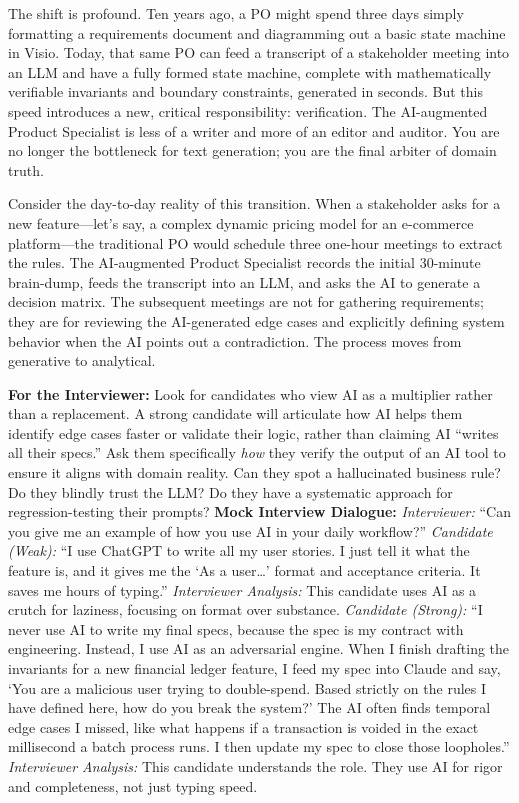 \documentclass[
  11pt,
  openany,
  oneside]{book}
\renewenvironment{quote}{\begin{customquote}}{\end{customquote}}
\begin{document}
The shift is profound. Ten years ago, a PO might spend three days simply
formatting a requirements document and diagramming out a basic state
machine in Visio. Today, that same PO can feed a transcript of a
stakeholder meeting into an LLM and have a fully formed state machine,
complete with mathematically verifiable invariants and boundary
constraints, generated in seconds. But this speed introduces a new,
critical responsibility: verification. The AI-augmented Product
Specialist is less of a writer and more of an editor and auditor. You
are no longer the bottleneck for text generation; you are the final
arbiter of domain truth.

Consider the day-to-day reality of this transition. When a stakeholder
asks for a new feature---let's say, a complex dynamic pricing model for
an e-commerce platform---the traditional PO would schedule three
one-hour meetings to extract the rules. The AI-augmented Product
Specialist records the initial 30-minute brain-dump, feeds the
transcript into an LLM, and asks the AI to generate a decision matrix.
The subsequent meetings are not for gathering requirements; they are for
reviewing the AI-generated edge cases and explicitly defining system
behavior when the AI points out a contradiction. The process moves from
generative to analytical.

\begin{quote}
\textbf{For the Interviewer:} Look for candidates who view AI as a
multiplier rather than a replacement. A strong candidate will articulate
how AI helps them identify edge cases faster or validate their logic,
rather than claiming AI ``writes all their specs.'' Ask them
specifically \emph{how} they verify the output of an AI tool to ensure
it aligns with domain reality. Can they spot a hallucinated business
rule? Do they blindly trust the LLM? Do they have a systematic approach
for regression-testing their prompts? \textbf{Mock Interview Dialogue:}
\emph{Interviewer:} ``Can you give me an example of how you use AI in
your daily workflow?'' \emph{Candidate (Weak):} ``I use ChatGPT to write
all my user stories. I just tell it what the feature is, and it gives me
the `As a user\ldots{}' format and acceptance criteria. It saves me
hours of typing.'' \emph{Interviewer Analysis:} This candidate uses AI
as a crutch for laziness, focusing on format over substance.
\emph{Candidate (Strong):} ``I never use AI to write my final specs,
because the spec is my contract with engineering. Instead, I use AI as
an adversarial engine. When I finish drafting the invariants for a new
financial ledger feature, I feed my spec into Claude and say, `You are a
malicious user trying to double-spend. Based strictly on the rules I
have defined here, how do you break the system?' The AI often finds
temporal edge cases I missed, like what happens if a transaction is
voided in the exact millisecond a batch process runs. I then update my
spec to close those loopholes.'' \emph{Interviewer Analysis:} This
candidate understands the role. They use AI for rigor and completeness,
not just typing speed.
\end{quote}
\end{document}
